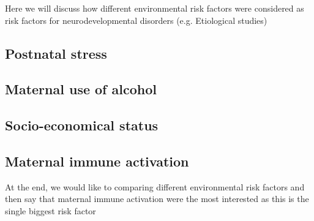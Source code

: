 Here we will discuss how different environmental risk factors were considered as risk factors for neurodevelopmental disorders (e.g. Etiological studies)
\subsection{Postnatal stress}
\subsection{Maternal use of alcohol}
\subsection{Socio-economical status}
\subsection{Maternal immune activation}
At the end, we would like to comparing different environmental risk factors and then say that maternal immune activation were the most interested as this is the single biggest risk factor
